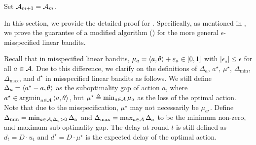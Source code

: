 \begin{algorithm}
{    
    
    \nl Set ${\mathcal{A}}_{m+1} = {\mathcal{A}}_m$.
    
    \nl {}
}
\end{algorithm}

In this section, we provide the detailed proof for . Specifically, as mentioned in , we prove the guarantee of a modified algorithm () for the more general $\epsilon$-misspecified linear bandits. 

Recall that in misspecified linear bandits, $\mu_a = \left\langle {a,\theta} \right\rangle+\varepsilon_a\in[0,1]$ with $|\epsilon_a|\leq\epsilon$ for all $a\in{\mathcal{A}}$. Due to this difference, we clarify on the definitions of $\Delta_a$, $a^\star$, $\mu^\star$, $\Delta_{\min}$, $\Delta_{\max}$, and $d^\star$ in misspecified linear bandits as follows. We still define $\Delta_a = \left\langle {a^\star-a,\theta} \right\rangle$ as the suboptimality gap of action $a$, where $a^\star \in \operatorname*{argmin}_{a\in{\mathcal{A}}}\left\langle {a, \theta} \right\rangle$, but $\mu^\star \triangleq \min_{a\in{\mathcal{A}}}\mu_a$ as the loss of the optimal action. Note that due to the misspecification, $\mu^\star$ may not necessarily be $\mu_{a^\star}$. Define $\Delta_{\min} = \min_{a\in {\mathcal{A}}, \Delta_a>0}\Delta_a$ and $\Delta_{\max} = \max_{a\in {\mathcal{A}}}\Delta_a$ to be the minimum non-zero, and maximum sub-optimality gap. The delay at round $t$ is still defined as $d_t=D\cdot u_t$ and $d^\star = D\cdot \mu^\star$ is the expected delay of the optimal action.

